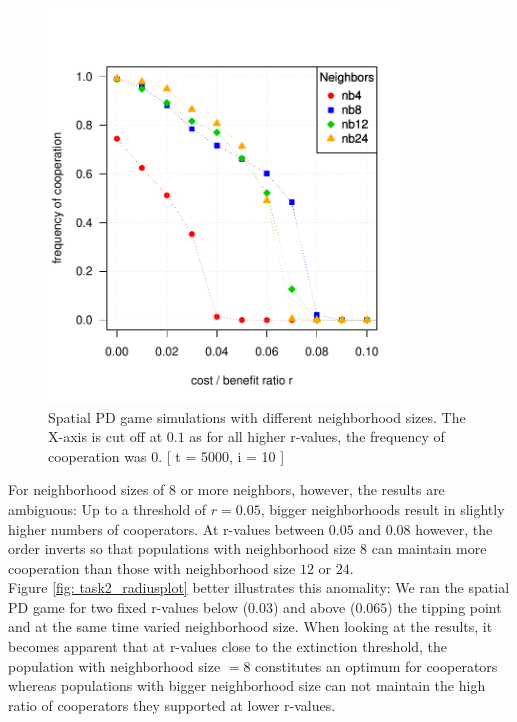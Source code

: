 \begin{figure}
	\centering 
	\includegraphics[width=9.5cm]{task2_multiplot}
	\caption{Spatial PD game simulations with different neighborhood sizes. The X-axis is cut off at $0.1$ as for all higher r-values, the frequency of cooperation was $0$. [ t = 5000, i = 10 ] }\label{fig: task2_multiplot}
\end{figure}
 
\noindent For neighborhood sizes of $8$ or more neighbors, however, the results are ambiguous: Up to a threshold of $r=0.05$, bigger neighborhoods result in slightly higher numbers of cooperators. At r-values between $0.05$ and $0.08$ however, the order inverts so that populations with neighborhood size $8$ can maintain more cooperation than those with neighborhood size $12$ or $24$. \\ 
Figure \ref{fig: task2_radiusplot} better illustrates this anomality: We ran the spatial PD game for two fixed r-values below ($0.03$) and above ($0.065$) the tipping point and at the same time varied neighborhood size. When looking at the results, it becomes apparent that at r-values close to the extinction threshold, the population with neighborhood size $=8$ constitutes an optimum for cooperators whereas populations with bigger neighborhood size can not maintain the high ratio of cooperators they supported at lower r-values.


